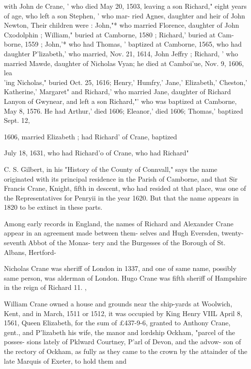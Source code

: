 \documentclass{book}
\begin{document}
with John de Crane, ' who died May 20, 1503, leaving a son 
Richard," eight years of age, who left a son Stephen, ' who mar- 
ried Agnes, daughter and heir of John Newton, Their children 
were : John,"* who married Florence, daughter of John Cxodolphin ; 
William," buried at Camborne, 1580 ; Richard,' buried at Cam- 
borne, 1559 ; John,'* who had Thomas, ' baptized at Camborne, 
1565, who had daughter P'lizabeth,' who married, Nov. 21, 1614, 
John Jeffry ; Richard, ' who married Mawde, daughter of Nicholas 
Vyan; he died at Camboi'ue, Nov. 9, 1606, lea\\'ing Nicholas," 
buried Oct. 25, 1616; Henry,' Humfry,' Jane,' Elizabeth,' 
Cheston,' Katherine,' Margaret" and Richard,' who married Jane, 
daughter of Richard Lanyon of Gwynear, and left a son Richard,"' 
who was baptized at Camborne, May 8, 1576. He had Arthur,' 
died 1606; Eleanor,' died 1606; Thomas,' baptized Sept. 12, 

1606, married Elizabeth ; had Richard' of Crane, baptized 

July 18, 1631, who had Richard'o of Crane, who had Richard" 

C. S. Gilbert, in his "History of the County of Connvall," 
says the name originated with its principal residence in the Parish 
of Camborne, and that Sir Francis Crane, Knight, fifth in descent, 
who had resided at that place, was one of the Representatives for 
Penryii in the year 1620. But that the name appears in 1820 to 
be extinct in these parts. 

Among early records in England, the names of Richard and 
Alexander Crane appear in an agreement made between them- 
selves and Hugh Eversden, twenty-seventh Abbot of the Monas- 
tery and the Burgesses of the Borough of St. Albans, Hertford- 

Nicholas Crane was sheriff of London in 1337, and one of same 
name, possibly same person, was alderman of London. Hugo 
Crane was fifth sheriff of Hampshire in the reign of Richard 11. , 

William Crane owned a house and grounds near the ship-yards 
at Woolwich, Kent, and in March, 1511 or 1512, it was occupied 
by King Henry VIIL April 8, 1561, Queen Elizabeth, for the sum 
of £437-9-6, granted to Anthony Crane, gent., and P'lizabeth 
his wife, the manor and lordship Ockham, "parcel of the posses- 
sions lately of Pklward Courtney, P'arl of Devon, and the advow- 
son of the rectory of Ockham, as fully as they came to the crown 
by the attainder of the late Marquis of Exeter, to hold them and 
\end{document}
